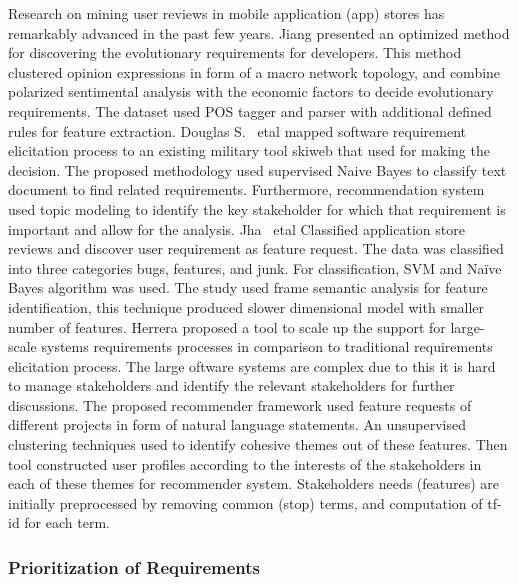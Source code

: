 Research on mining user reviews in mobile application (app) stores has
remarkably advanced in the past few years. Jiang \etal \cite{Jiang:2014}
presented an optimized method for discovering the evolutionary requirements for
developers. This method clustered opinion expressions in form of a macro network
topology, and combine polarized sentimental analysis with the economic factors
to decide evolutionary requirements. The dataset used POS tagger and parser with
additional defined rules for feature extraction. Douglas S. ~etal
\cite{Douglas:S2008} mapped software requirement elicitation process to an
existing military tool skiweb that used for making the decision. The proposed
methodology used supervised Naive Bayes to classify text document to find
related requirements. Furthermore, recommendation system used topic modeling to
identify the key stakeholder for which that requirement is important and allow
for the analysis. Jha ~etal \cite{Jha:2017} Classified application store reviews
and discover user requirement as feature request. The data was classified into
three categories bugs, features, and junk. For classification, SVM and Naïve
Bayes algorithm was used. The study used frame semantic analysis for feature
identification, this technique produced slower  dimensional model
with smaller number of features. Herrera\etal\cite{Castro-Herrera:2009}  proposed a tool to scale up the support 
 for large-scale systems requirements processes in comparison to traditional requirements elicitation process. The large oftware systems are complex due to this 
it is hard to manage stakeholders and identify the relevant stakeholders for further discussions.
 The proposed recommender framework used feature requests of different projects in form of natural language statements. 
An unsupervised clustering techniques used to identify cohesive themes out of these features. Then tool constructed user
profiles according to the interests of the stakeholders in each of these themes for recommender system. Stakeholders needs (features) are initially preprocessed by
 removing common (stop) terms, and computation of  tf-id for each term. 

\subsubsection{Prioritization of Requirements} 

